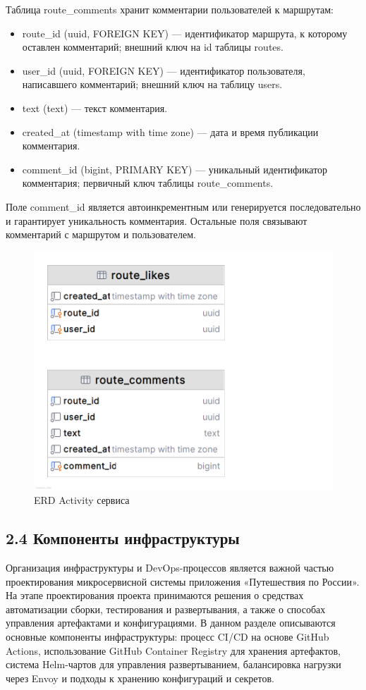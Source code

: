 Таблица route\_comments хранит комментарии пользователей к маршрутам:
\begin{itemize}
    \item route\_id (uuid, FOREIGN KEY) — идентификатор маршрута, к которому оставлен комментарий; внешний ключ на id таблицы routes.
    \item user\_id (uuid, FOREIGN KEY) — идентификатор пользователя, написавшего комментарий; внешний ключ на таблицу users.
    \item text (text) — текст комментария.
    \item created\_at (timestamp with time zone) — дата и время публикации комментария.
    \item comment\_id (bigint, PRIMARY KEY) — уникальный идентификатор комментария; первичный ключ таблицы route\_comments.
\end{itemize}
\noindent Поле comment\_id является автоинкрементным или генерируется последовательно и гарантирует уникальность комментария. Остальные поля связывают комментарий с маршрутом и пользователем.
\begin{figure}[H]
        \centering
        \includegraphics[width=0.8\linewidth]{Images/second_chapter_backend_architecture/Picture13.png}
        \caption{ERD Activity сервиса}
        \label{fig:activity-service-erd}
\end{figure}

\subsection*{2.4 Компоненты инфраструктуры}
Организация инфраструктуры и DevOps-процессов является важной частью проектирования микросервисной системы приложения «Путешествия по России». На этапе проектирования проекта принимаются решения о средствах автоматизации сборки, тестирования и развертывания, а также о способах управления артефактами и конфигурациями. В данном разделе описываются основные компоненты инфраструктуры: процесс CI/CD на основе GitHub Actions, использование GitHub Container Registry для хранения артефактов, система Helm-чартов для управления развертыванием, балансировка нагрузки через Envoy и подходы к хранению конфигураций и секретов.

